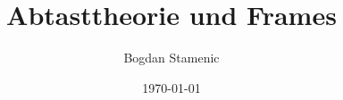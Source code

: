 

\newcommand{\FormelsammlungTitel}{Abtasttheorie und Frames}
\newcommand{\FormelsammlungAutor}{Bogdan Stamenic}
\setcounter{tocdepth}{2} %


\newcommand{\V}{\mathcal{V}}
\newcommand{\X}{\mathcal{X}}
\newcommand{\F}{\mathbb{V}}
\renewcommand{\natural}{\mathbb{N}}
\newcommand{\real}{\mathbb{R}}
\newcommand{\complex}{\mathbb{C}}


	\title{\FormelsammlungTitel}
	\author{\FormelsammlungAutor}
	\date{\today}
	\begin{multicols*}{3}
			\maketitle
			\tableofcontents
		
		
		
	\end{multicols*}


